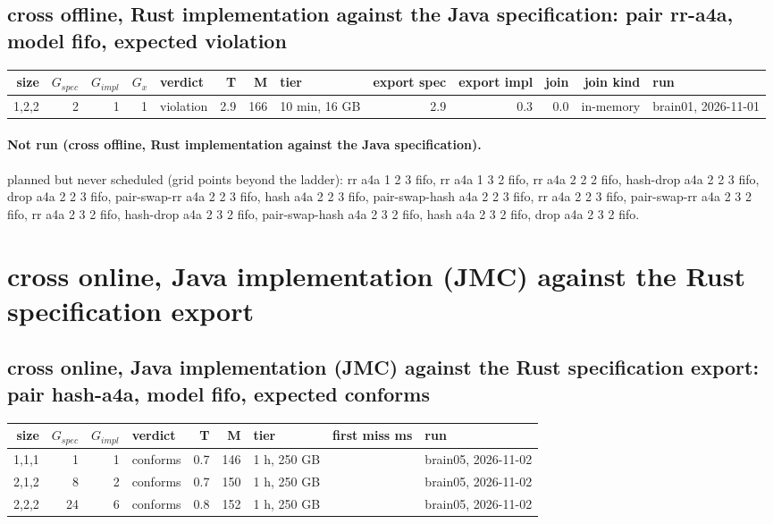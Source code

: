 \documentclass[10pt]{article}
\begin{document}
\subsection*{cross offline, Rust implementation against the Java specification: pair \textsf{rr-a4a}, model fifo, expected violation}
\begin{longtable}{@{}rrrrlrrlrrrrl@{}}
\toprule
size & $G_{\mathit{spec}}$ & $G_{\mathit{impl}}$ & $G_x$ & verdict & T & M & tier & export spec & export impl & join & join kind & run \\
\midrule
\endhead
\color{red} 1,2,2 & 2 & 1 & 1 & violation & 2.9 & 166 & 10 min, 16 GB & 2.9 & 0.3 & 0.0 & in-memory & brain01, 2026-11-01 \\
\bottomrule
\end{longtable}
\paragraph{Not run (cross offline, Rust implementation against the Java specification).}
planned but never scheduled (grid points beyond the ladder): rr a4a 1 2 3 fifo, rr a4a 1 3 2 fifo, rr a4a 2 2 2 fifo, hash-drop a4a 2 2 3 fifo, drop a4a 2 2 3 fifo, pair-swap-rr a4a 2 2 3 fifo, hash a4a 2 2 3 fifo, pair-swap-hash a4a 2 2 3 fifo, rr a4a 2 2 3 fifo, pair-swap-rr a4a 2 3 2 fifo, rr a4a 2 3 2 fifo, hash-drop a4a 2 3 2 fifo, pair-swap-hash a4a 2 3 2 fifo, hash a4a 2 3 2 fifo, drop a4a 2 3 2 fifo.\par
\section*{cross online, Java implementation (JMC) against the Rust specification export}
\subsection*{cross online, Java implementation (JMC) against the Rust specification export: pair \textsf{hash-a4a}, model fifo, expected conforms}
\begin{longtable}{@{}rrrlrrlrl@{}}
\toprule
size & $G_{\mathit{spec}}$ & $G_{\mathit{impl}}$ & verdict & T & M & tier & first miss ms & run \\
\midrule
\endhead
\color{red} 1,1,1 & 1 & 1 & conforms & 0.7 & 146 & 1 h, 250 GB &  & brain05, 2026-11-02 \\
\color{red} 2,1,2 & 8 & 2 & conforms & 0.7 & 150 & 1 h, 250 GB &  & brain05, 2026-11-02 \\
\color{red} 2,2,2 & 24 & 6 & conforms & 0.8 & 152 & 1 h, 250 GB &  & brain05, 2026-11-02 \\
\bottomrule
\end{longtable}
\end{document}
